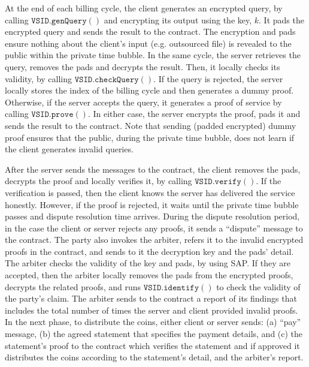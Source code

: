  
 
At the end of each billing cycle, the client generates an encrypted query, by calling $\mathtt{VSID.genQuery}()$ and encrypting its output using the key, $k$. It pads the encrypted query and  sends the result  to the contract. The encryption and pads ensure  nothing about the client's input (e.g. outsourced file) is revealed to the public within the private time bubble.  In the same cycle, the server retrieves the query, removes the pads and decrypts the result. Then, it locally checks its validity, by calling $\mathtt{VSID.checkQuery}()$. If the query is rejected, the server locally stores the index of the billing cycle and then  generates a dummy proof.  Otherwise, if the server accepts the query, it generates a proof of service by calling $\mathtt{VSID.prove}()$. In either case, the server encrypts the proof, pads it and sends the result to the contract. Note that sending (padded encrypted) dummy proof ensures that the public, during the private time bubble, does not learn if the client generates invalid queries. 

 After the server sends the messages to the contract, the client removes the pads, decrypts the proof and locally verifies it, by calling $\mathtt{VSID.verify}()$. If the verification is passed, then the client knows the server has delivered the service honestly. However, if the proof is rejected,  it waits until the private time bubble passes and dispute resolution time arrives. During the dispute resolution period, in the case the client or server  rejects any proofs, it sends a ``dispute'' message to the contract. The party also invokes the arbiter,  refers it to the invalid encrypted proofs in the contract, and  sends to it the decryption key and the pads' detail. The arbiter checks the validity of the key and pads, by using SAP. If they are accepted,  then the arbiter locally removes the pads from the encrypted proofs,   decrypts the related proofs, and runs $\mathtt{VSID.identify}()$ to check the validity of the party's claim. The arbiter sends to the contract a report of its findings that includes  the total number of times  the server and client provided invalid proofs. In the next phase, to distribute the coins, either client or server  sends: (a) ``pay'' message, (b) the agreed statement that specifies the payment details, and (c) the statement's proof to the contract which verifies the statement and if approved it distributes the coins according to the statement's detail, and the arbiter's report. 

